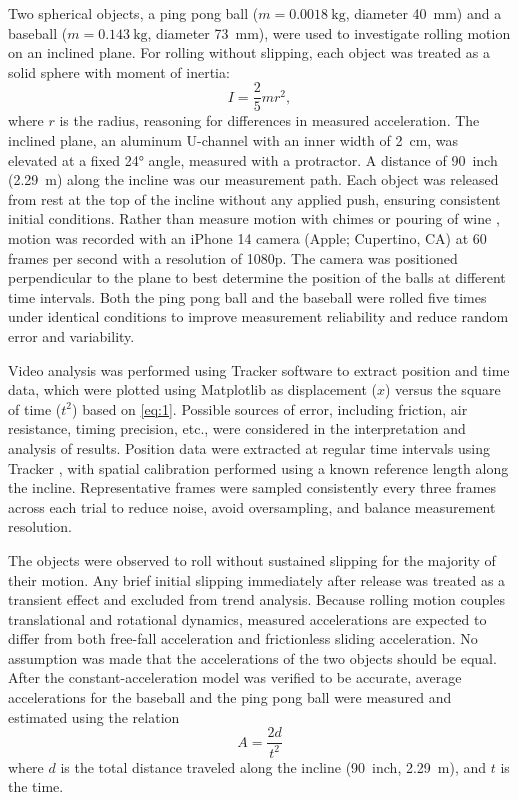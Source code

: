 \documentclass[reprint,amsmath,amssymb,aps,twoside]{revtex4-2}
\begin{document}
Two spherical objects, a ping pong ball ($m=\qty{0.0018}{\kilo\gram}$, diameter \qty{40}{\milli\meter}) and a baseball ($m=\qty{0.143}{\kilo\gram}$, diameter \qty{73}{\milli\meter}), were used to investigate rolling motion on an inclined plane. For rolling without slipping, each object was treated as a solid sphere with moment of inertia:
\begin{equation}
I = \frac{2}{5} m r^2,
\end{equation}
where $r$ is the radius, reasoning for differences in measured acceleration. The inclined plane, an aluminum U-channel with an inner width of \qty{2}{\centi\meter}, was elevated at a fixed \ang{24} angle, measured with a protractor. A distance of \qty{90}{inch} (\qty{2.29}{\meter}) along the incline was our measurement path. Each object was released from rest at the top of the incline without any applied push, ensuring consistent initial conditions. Rather than measure motion with chimes or pouring of wine \cite{galilei:1638:discorsi}, motion was recorded with an iPhone 14 camera (Apple; Cupertino, CA) at 60 frames per second with a resolution of 1080p. The camera was positioned perpendicular to the plane to best determine the position of the balls at different time intervals. Both the ping pong ball and the baseball were rolled five times under identical conditions to improve measurement reliability and reduce random error and variability.

Video analysis was performed using Tracker software \cite{tracker, renika:2024:kinematics} to extract position and time data, which were plotted using Matplotlib as displacement ($x$) versus the square of time ($t^2$) based on \cref{eq:1}. Possible sources of error, including friction, air resistance, timing precision, etc., were considered in the interpretation and analysis of results. Position data were extracted at regular time intervals using Tracker \cite{tracker}, with spatial calibration performed using a known reference length along the incline. Representative frames were sampled consistently every three frames across each trial to reduce noise, avoid oversampling, and balance measurement resolution.

The objects were observed to roll without sustained slipping for the majority of their motion. Any brief initial slipping immediately after release was treated as a transient effect and excluded
from trend analysis. Because rolling motion couples translational and rotational dynamics, measured accelerations are expected to differ from both free-fall acceleration and frictionless sliding acceleration. No assumption was made that the accelerations of the two objects should be equal. After the constant-acceleration model was verified to be accurate, average accelerations for the baseball and the ping pong ball were measured and estimated using the relation \cite{tipler, openstax, barrons}
\begin{equation}
A = \dfrac{2d}{t^2}
\end{equation}
where $d$ is the total distance traveled along the incline (\qty{90}{inch}, \qty{2.29}{\meter}), and $t$ is the time. %
\end{document}
